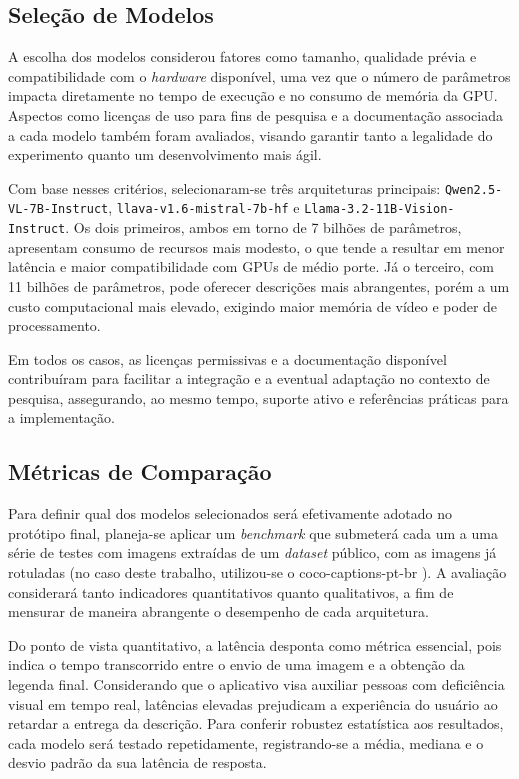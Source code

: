 \subsection{Seleção de Modelos}

A escolha dos modelos considerou fatores como tamanho, qualidade prévia e compatibilidade com o \textit{hardware} disponível, uma vez que o número de parâmetros impacta diretamente no tempo de execução e no consumo de memória da GPU. Aspectos como licenças de uso para fins de pesquisa e a documentação associada a cada modelo também foram avaliados, visando garantir tanto a legalidade do experimento quanto um desenvolvimento mais ágil.

Com base nesses critérios, selecionaram-se três arquiteturas principais: \texttt{Qwen2.5-VL-7B-Instruct}, \texttt{llava-v1.6-mistral-7b-hf} e \texttt{Llama-3.2-11B-Vision-Instruct}. Os dois primeiros, ambos em torno de 7 bilhões de parâmetros, apresentam consumo de recursos mais modesto, o que tende a resultar em menor latência e maior compatibilidade com GPUs de médio porte. Já o terceiro, com 11 bilhões de parâmetros, pode oferecer descrições mais abrangentes, porém a um custo computacional mais elevado, exigindo maior memória de vídeo e poder de processamento. 

Em todos os casos, as licenças permissivas e a documentação disponível contribuíram para facilitar a integração e a eventual adaptação no contexto de pesquisa, assegurando, ao mesmo tempo, suporte ativo e referências práticas para a implementação.

\subsection{Métricas de Comparação}

Para definir qual dos modelos selecionados será efetivamente adotado no protótipo final, planeja-se aplicar um \textit{benchmark} que submeterá cada um a uma série de testes com imagens extraídas de um \textit{dataset} público, com as imagens já rotuladas (no caso deste trabalho, utilizou-se o coco-captions-pt-br \cite{bromonschenkel2024cocopt}). A avaliação considerará tanto indicadores quantitativos quanto qualitativos, a fim de mensurar de maneira abrangente o desempenho de cada arquitetura.

Do ponto de vista quantitativo, a latência desponta como métrica essencial, pois indica o tempo transcorrido entre o envio de uma imagem e a obtenção da legenda final. Considerando que o aplicativo visa auxiliar pessoas com deficiência visual em tempo real, latências elevadas prejudicam a experiência do usuário ao retardar a entrega da descrição. Para conferir robustez estatística aos resultados, cada modelo será testado repetidamente, registrando-se a média, mediana e o desvio padrão da sua latência de resposta.

